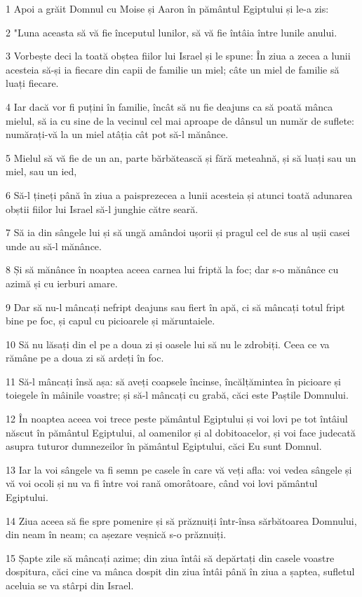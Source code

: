 \par 1 Apoi a grăit Domnul cu Moise și Aaron în pământul Egiptului și le-a zis:
\par 2 "Luna aceasta să vă fie începutul lunilor, să vă fie întâia între lunile anului.
\par 3 Vorbește deci la toată obștea fiilor lui Israel și le spune: În ziua a zecea a lunii acesteia să-și ia fiecare din capii de familie un miel; câte un miel de familie să luați fiecare.
\par 4 Iar dacă vor fi puțini în familie, încât să nu fie deajuns ca să poată mânca mielul, să ia cu sine de la vecinul cel mai aproape de dânsul un număr de suflete: numărați-vă la un miel atâția cât pot să-l mănânce.
\par 5 Mielul să vă fie de un an, parte bărbătească și fără meteahnă, și să luați sau un miel, sau un ied,
\par 6 Să-l țineți până în ziua a paisprezecea a lunii acesteia și atunci toată adunarea obștii fiilor lui Israel să-l junghie către seară.
\par 7 Să ia din sângele lui și să ungă amândoi ușorii și pragul cel de sus al ușii casei unde au să-l mănânce.
\par 8 Și să mănânce în noaptea aceea carnea lui friptă la foc; dar s-o mănânce cu azimă și cu ierburi amare.
\par 9 Dar să nu-l mâncați nefript deajuns sau fiert în apă, ci să mâncați totul fript bine pe foc, și capul cu picioarele și măruntaiele.
\par 10 Să nu lăsați din el pe a doua zi și oasele lui să nu le zdrobiți. Ceea ce va rămâne pe a doua zi să ardeți în foc.
\par 11 Să-l mâncați însă așa: să aveți coapsele încinse, încălțămintea în picioare și toiegele în mâinile voastre; și să-l mâncați cu grabă, căci este Paștile Domnului.
\par 12 În noaptea aceea voi trece peste pământul Egiptului și voi lovi pe tot întâiul născut în pământul Egiptului, al oamenilor și al dobitoacelor, și voi face judecată asupra tuturor dumnezeilor în pământul Egiptului, căci Eu sunt Domnul.
\par 13 Iar la voi sângele va fi semn pe casele în care vă veți afla: voi vedea sângele și vă voi ocoli și nu va fi între voi rană omorâtoare, când voi lovi pământul Egiptului.
\par 14 Ziua aceea să fie spre pomenire și să prăznuiți într-însa sărbătoarea Domnului, din neam în neam; ca așezare veșnică s-o prăznuiți.
\par 15 Șapte zile să mâncați azime; din ziua întâi să depărtați din casele voastre dospitura, căci cine va mânca dospit din ziua întâi până în ziua a șaptea, sufletul aceluia se va stârpi din Israel.
